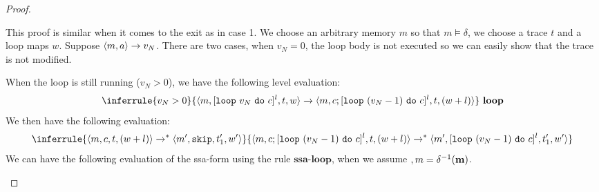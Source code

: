 \documentclass[a4paper,11pt]{article}
\begin{document}
\begin{proof}
\begin{itemize}
{%
This proof is similar when it comes to the exit as in case 1. 
}
%
We choose an arbitrary memory $m$ so that $m \vDash \delta$, we choose a trace $t$ and a loop maps $w$. Suppose $ \langle m ,a \rangle \to v_N $. There are two cases, when $v_N=0$, the loop body is not executed so we can easily show that the trace is not modified.

 When the loop is still running ($v_N > 0$), we have the following level evaluation:
\[
{\inferrule
{
 \valr_N > 0
}
{
\config{m, [\eloop ~ \valr_N  ~ \edo ~ c]^{l} ,  t, w }
\xrightarrow{} \config{m, c ;  [\eloop ~ (\valr_N-1) ~ \edo ~ c ]^{l},  t, (w + l) }
}
~\textbf{loop}
}
\]
We then have the following evaluation:
\[
 \inferrule{
 \config{m, c , t, (w + l)  } \to^{*} \config{m', \eskip , t'_{1}, w'   }
 }{
 \config{m, c ;  [\eloop ~ (\valr_N-1) ~ \edo ~ c ]^{l},  t, (w + l) } 
 \to^{*} \config{m',   [\eloop ~ (\valr_N-1) ~ \edo ~ c ]^{l},  t'_{1}, w'  } 
  }
\]
 We can have the following evaluation of the ssa-form using the rule $\textbf{ssa-loop}$, when we assume  $ ,m = \delta^{-1}(\mathbf{{m}})$.


\end{itemize}
\end{proof}
\end{document}
